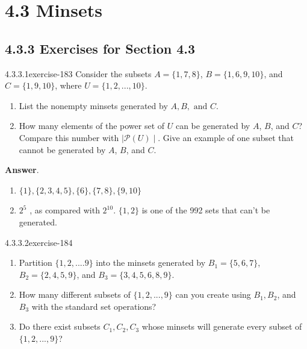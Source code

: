 \documentclass[twoside,10pt,]{book}
\numberwithin{equation}{section}
\begin{document}
\section*{4.3 Minsets}
\subsection*{4.3.3 Exercises for Section 4.3}
\begin{divisionsolution}{4.3.3.1}{}{exercise-183}%
\hypertarget{p-1637}{}%
Consider the subsets \(A = \{1, 7, 8\}\), \(B = \{1, 6, 9, 10\}\), and \(C = \{1, 9, 10\}\), where \(U = \{1,2, . . . , 10\}\).%
\par
\hypertarget{p-1638}{}%
\leavevmode%
\begin{enumerate}[label=(\alph*)]
\item\hypertarget{li-870}{}\hypertarget{p-1639}{}%
List the nonempty minsets generated by \(A, B, \textrm{ and } C\).%
\item\hypertarget{li-871}{}\hypertarget{p-1640}{}%
How many elements of the power set of \(U\) can be generated by \(A\), \(B\), and \(C\)? Compare this number with \(\mid\mathcal{P}(U)\mid\).  Give an example of one subset that cannot be generated by \(A\), \(B\), and \(C\).%
\end{enumerate}
%
\par\smallskip%
\noindent\textbf{Answer}.\quad%
\hypertarget{p-1641}{}%
\leavevmode%
\begin{enumerate}[label=(\alph*)]
\item\hypertarget{li-872}{}\hypertarget{p-1642}{}%
\(\{1\}, \{2, 3, 4, 5\}, \{6\}, \{7, 8\}, \{9, 10\}\)%
\item\hypertarget{li-873}{}\hypertarget{p-1643}{}%
\(2^5\) , as compared with \(2^{10}\).   \(\{1, 2\}\) is one of the 992 sets that can't be generated.%
\end{enumerate}
%
\end{divisionsolution}%
\begin{divisionsolution}{4.3.3.2}{}{exercise-184}%
\hypertarget{p-1644}{}%
\leavevmode%
\begin{enumerate}[label=(\alph*)]
\item\hypertarget{li-874}{}\hypertarget{p-1645}{}%
Partition \(\{1, 2, .... 9\}\) into the minsets generated by \(B_1= \{5, 6,7\}\), \(B_2 = \{2, 4, 5, 9\}\), and \(B_3 = \{3, 4, 5, 6, 8, 9\}\).%
\item\hypertarget{li-875}{}\hypertarget{p-1646}{}%
How many different subsets of \(\{1, 2, . . . ,9\}\) can you create using \(B_1, B_2\), and \(B_3\) with the standard set operations?%
\item\hypertarget{li-876}{}\hypertarget{p-1647}{}%
Do there exist subsets \(C_1, C_2, C_3\) whose minsets will generate every subset of \(\{1,2, . . . ,9\}\)?%
\end{enumerate}
%
\end{divisionsolution}%
\end{document}
